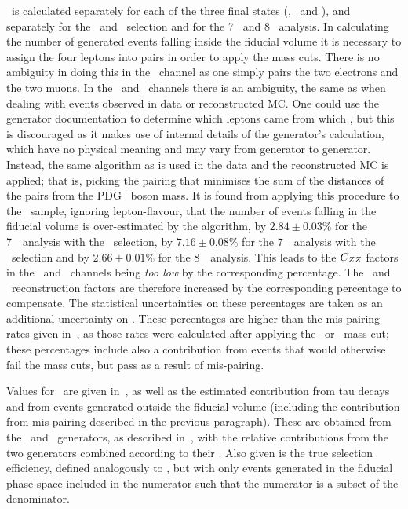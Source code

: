 \CZZ\ is calculated separately for each of the three final states (\eeee, \mmmm\
and \eemm), and separately for the \ZZ\ and \ZZs\ selection and for the 7 \tev\
and 8 \tev\ analysis. In calculating the number of generated events falling inside the fiducial volume
it is necessary to assign the four leptons into pairs in order to apply the mass
cuts. There is no ambiguity in doing this in the \eemm\ channel as one simply
pairs the two electrons and the two muons. In the \eeee\ and \mmmm\ channels
there is an ambiguity, the same as when dealing with events observed in data or
reconstructed MC. One could use the generator documentation to determine which
leptons came from which \Z, but this is discouraged as it makes use of internal
details of the generator's calculation, which have no physical meaning and may
vary from generator to generator. Instead,
the same algorithm as is used in the data and the reconstructed MC is applied; that is,
picking the pairing that minimises the sum of the distances of the pairs from
the PDG \Z\ boson mass. It is found from applying this procedure to the \eemm\
sample, ignoring lepton-flavour, that the number of events falling in the
fiducial volume is over-estimated by the algorithm, by $2.84\pm0.03\%$
for the 7~\tev\ analysis with the \ZZ\ selection, by $7.16\pm0.08\%$ for the
7~\tev\ analysis with the \ZZs\ selection and by $2.66\pm0.01\%$ for the
8~\tev\ analysis.
This leads to the  $C_{ZZ}$ factors in the
\eeee\ and \mmmm\ channels being {\it too low} by the corresponding percentage. 
The \eeee\ and \mmmm\
reconstruction factors are therefore increased by the corresponding percentage
to compensate. The statistical uncertainties on these percentages are taken as an
additional uncertainty on \CZZ. These percentages are higher than the
mis-pairing rates given in~, as those rates were calculated
after applying the \ZZ\ or \ZZs\ mass cut; these percentages include also a
contribution from events that would otherwise fail the mass cuts, but pass as a
result of mis-pairing.

Values for \CZZ\ are given
in~\tabs{objSel-czz-seven}{objSel-czz-eight}, as well as the estimated
contribution from tau decays and from events generated outside the fiducial
volume (including the contribution from mis-pairing described in the previous
paragraph). These are obtained from the \powhegbox\ and \ggZZ\ generators, as
described in~\sec{}, with the relative contributions from the two generators
combined according to their \cx.
Also given is the true selection efficiency, defined analogously to \CZZ, but
with only events generated in the fiducial phase space included in the numerator
such that the numerator is a subset of the denominator.

